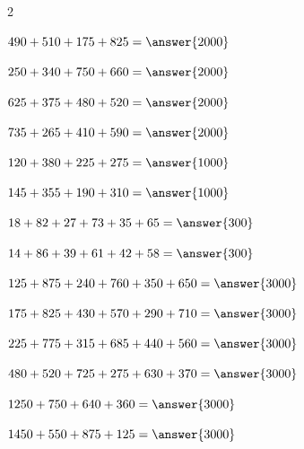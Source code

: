 \documentclass{ximera}
\begin{document}
\begin{oefening}{\oefB\ESS}
\begin{multicols}{2}
    \begin{question} \(490+510+175+825=\answer{2000}\) \end{question}
    
    \begin{question} \(250+340+750+660=\answer{2000}\) \end{question}
    
    \begin{question} \(625+375+480+520=\answer{2000}\) \end{question}
    
    \begin{question} \(735+265+410+590=\answer{2000}\) \end{question}
    
    \begin{question} \(120+380+225+275=\answer{1000}\) \end{question}
    
    \begin{question} \(145+355+190+310=\answer{1000}\) \end{question}
    
    \begin{question} \(18+82+27+73+35+65=\answer{300}\) \end{question}
    
    \begin{question} \(14+86+39+61+42+58=\answer{300}\) \end{question}
    
    \begin{question} \(125+875+240+760+350+650=\answer{3000}\) \end{question}
    
    \begin{question} \(175+825+430+570+290+710=\answer{3000}\) \end{question}
    
    \begin{question} \(225+775+315+685+440+560=\answer{3000}\) \end{question}
    
    \begin{question} \(480+520+725+275+630+370=\answer{3000}\) \end{question}
    
    \begin{question} \(1250+750+640+360=\answer{3000}\) \end{question}
    
    \begin{question} \(1450+550+875+125=\answer{3000}\) \end{question}
    

\end{multicols}
\end{oefening}
\end{document}
